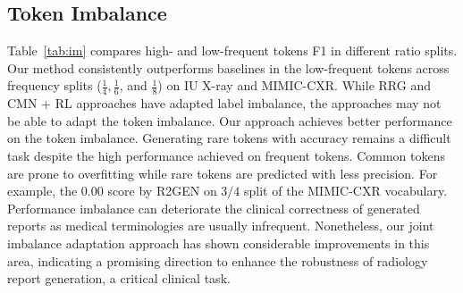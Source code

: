 \documentclass[sn-mathphys-num]{sn-jnl}%
\theoremstyle{thmstyleone}%
\theoremstyle{thmstyletwo}%
\theoremstyle{thmstylethree}%
\begin{document}
\subsection{Token Imbalance} 
\label{subsec:imb_tok_perf}
Table~\ref{tab:im} compares high- and low-frequent tokens F1 in different ratio splits. 
Our method consistently outperforms baselines in the low-frequent tokens across frequency splits ($\frac{1}{4}, \frac{1}{6}$, and $ \frac{1}{8}$) on IU X-ray and MIMIC-CXR.
While RRG and CMN + RL approaches have adapted label imbalance, the approaches may not be able to adapt the token imbalance.
Our approach achieves better performance on the token imbalance. 
Generating rare tokens with accuracy remains a difficult task despite the high performance achieved on frequent tokens. 
Common tokens are prone to overfitting while rare tokens are predicted with less precision. 
For example, the 0.00 score by R2GEN on $3/4$ split of the MIMIC-CXR vocabulary. 
Performance imbalance can deteriorate the clinical correctness of generated reports as medical terminologies are usually infrequent.
Nonetheless, our joint imbalance adaptation approach has shown considerable improvements in this area, indicating a promising direction to enhance the robustness of radiology report generation, a critical clinical task.
\end{document}
